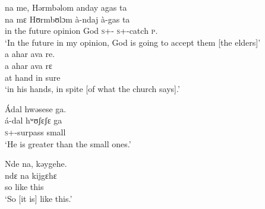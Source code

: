   na  me,  Hərmbəlom  anday  agas  ta   \\
    na     mɛ        Hʊrmbʊlɔm  à-ndaj       à-gas          ta\\
 {in the future}  {\PSP}  opinion  God           \textsc{s}+{\PFV}-{\PROG}  \textsc{s}+{\PFV}-catch  \textsc{p}.{\DO}  \\
 \glt ‘In the future in my opinion, God is going to accept them [the elders]’\\
 
 \medskip
 a  ahar  ava  re.\\
 \gll a    ahar  ava   rɛ\\
 at   hand  in      sure\\
 \glt ‘in his hands, in spite [of what the church says].’ 
 \z

\ea  Ádal  hwəsese  ga.\\
 \gll á-dal    hʷʊʃɛʃɛ  ga\\
 \textsc{s}+{\IFV}-surpass  small  {\ADJ}\\
 \glt ‘He is greater than the small ones.’
 \z

\ea Nde  na,  kəygehe.\\
 \gll ndɛ    na   kijgɛhɛ\\
 so    {\PSP}  {like this}\\
 \glt ‘So [it is] like this.’
\z
